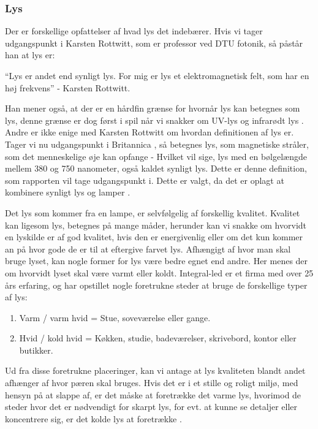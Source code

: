 \subsubsection{Lys}
Der er forskellige opfattelser af hvad lys det indebærer. Hvis vi tager udgangspunkt i Karsten Rottwitt, som er professor ved DTU fotonik, så påstår han at lys er:

“Lys er andet end synligt lys. For mig er lys et elektromagnetisk felt, som har en høj frekvens”
- Karsten Rottwitt.

Han mener også, at der er en hårdfin grænse for hvornår lys kan betegnes som lys, denne grænse er dog først i spil når vi snakker om UV-lys og infrarødt lys \cite{def_lys}. 
Andre er ikke enige med Karsten Rottwitt om hvordan definitionen af lys er. Tager vi nu udgangspunkt i Britannica \cite{britannica_lys}, så betegnes lys, som magnetiske stråler, som det menneskelige øje kan opfange - Hvilket vil sige, lys med en bølgelængde mellem 380 og 750 nanometer, også kaldet synligt lys. 
Dette er denne definition, som rapporten vil tage udgangspunkt i. Dette er valgt, da det er oplagt at kombinere synligt lys og lamper \cite{def_lys}.


Det lys som kommer fra en lampe, er selvfølgelig af forskellig kvalitet. Kvalitet kan ligesom lys, betegnes på mange måder, herunder kan vi snakke om hvorvidt en lyskilde er af god kvalitet, hvis den er energivenlig eller om det kun kommer an på hvor gode de er til at eftergive farvet lys. 
Afhængigt af hvor man skal bruge lyset, kan nogle former for lys være bedre egnet end andre. Her menes der om hvorvidt lyset skal være varmt eller koldt. Integral-led er et firma med over 25 års erfaring, og har opstillet nogle foretrukne steder at bruge de forskellige typer af lys:
\begin{enumerate}
\item Varm / varm hvid = Stue, soveværelse eller gange.
\item Hvid / kold hvid = Køkken, studie, badeværelser, skrivebord, kontor eller butikker.
\end{enumerate} 
Ud fra disse foretrukne placeringer, kan vi antage at lys kvaliteten blandt andet afhænger af hvor pæren skal bruges. Hvis det er i et stille og roligt miljø, med hensyn på at slappe af, er det måske at foretrække det varme lys, hvorimod de steder hvor det er nødvendigt for skarpt lys, for evt. at kunne se detaljer eller koncentrere sig, er det kolde lys at foretrække \cite{varm_kold}.

